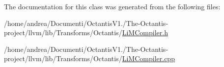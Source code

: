 The documentation for this class was generated from the following files\+:\begin{DoxyCompactItemize}
\item 
/home/andrea/\+Documenti/\+Octantis\+V1./\+The-\/\+Octantis-\/project/llvm/lib/\+Transforms/\+Octantis/\hyperlink{LiMCompiler_8h}{Li\+M\+Compiler.\+h}\item 
/home/andrea/\+Documenti/\+Octantis\+V1./\+The-\/\+Octantis-\/project/llvm/lib/\+Transforms/\+Octantis/\hyperlink{LiMCompiler_8cpp}{Li\+M\+Compiler.\+cpp}\end{DoxyCompactItemize}
